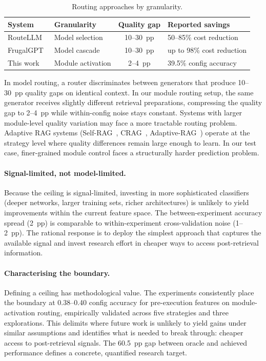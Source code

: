 \begin{table}[h!]
\centering
\small
\begin{tabular}{l l c l}
\hline
\textbf{System} & \textbf{Granularity} & \textbf{Quality gap} & \textbf{Reported savings} \\
\hline
RouteLLM~\cite{routellm2025}   & Model selection   & 10--30~pp & 50--85\% cost reduction \\
FrugalGPT~\cite{frugalgpt2023} & Model cascade     & 10--30~pp & up to 98\% cost reduction \\
This work                       & Module activation & 2--4~pp   & 39.5\% config accuracy \\
\hline
\end{tabular}
\caption{Routing approaches by granularity.}
\label{tab:routing-comparison}
\end{table}

In model routing, a router discriminates between generators that produce
10--30~pp quality gaps on identical context.  In our module routing setup,
the same generator receives slightly different retrieval preparations,
compressing the quality gap to 2--4~pp while within-config noise stays
constant.  Systems with larger module-level quality variation may face a
more tractable routing problem.  Adaptive RAG systems
(Self-RAG~\cite{selfrag2024}, CRAG~\cite{crag2024},
Adaptive-RAG~\cite{adaptiverag2024}) operate at the strategy level where
quality differences remain large enough to learn.  In our test case,
finer-grained module control faces a structurally harder prediction
problem.

\paragraph{Signal-limited, not model-limited.}
Because the ceiling is signal-limited, investing in more sophisticated
classifiers (deeper networks, larger training sets, richer architectures)
is unlikely to yield improvements within the current feature
space.  The between-experiment accuracy spread (2~pp) is comparable to
within-experiment cross-validation noise (1--2~pp).  The rational response
is to deploy the simplest approach that captures the available signal and
invest research effort in cheaper ways to access post-retrieval
information.

\paragraph{Characterising the boundary.}
Defining a ceiling has methodological value.  The experiments
consistently place the boundary at 0.38--0.40 config accuracy for
pre-execution features on module-activation routing, empirically
validated across five strategies and three explorations.  This delimits
where future work is unlikely to yield gains under similar assumptions
and identifies what is needed to break through: cheaper access to
post-retrieval signals.  The 60.5~pp gap between oracle and achieved
performance defines a concrete, quantified research target.



